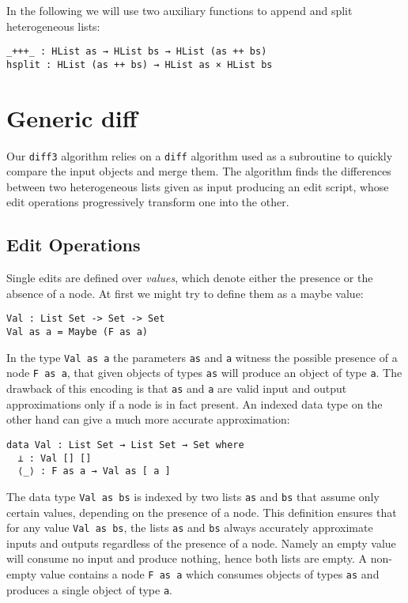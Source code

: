 \documentclass[preprint]{sigplanconf}
\begin{document}
	In the following we will use two auxiliary functions to append and split 
	heterogeneous lists:
\begin{verbatim}
_+++_ : HList as → HList bs → HList (as ++ bs)
hsplit : HList (as ++ bs) → HList as × HList bs
\end{verbatim}
	
\section{Generic diff}
	Our \texttt{diff3} algorithm relies on a \texttt{diff} algorithm used 
        as a subroutine to quickly compare the input objects and merge them.
	The algorithm finds the differences between two heterogeneous lists given 
	as input producing an edit script, whose edit operations progressively 
	transform one into the other.

	\subsection{Edit Operations}
	Single edits are defined over \emph{values}, which denote either the presence or 
	the absence of a node.
        At first we might try to define them as a maybe value:
\begin{verbatim}
Val : List Set -> Set -> Set
Val as a = Maybe (F as a)
\end{verbatim}
        In the type \texttt{Val as a} the parameters \texttt{as} and \texttt{a} 
        witness the possible presence of a node \texttt{F as a}, that given objects 
        of types \texttt{as} will produce an object of type \texttt{a}.
        The drawback of this encoding is that \texttt{as} and \texttt{a} are 
        valid input and output approximations only if a node is in fact present.
        An indexed data type on the other hand can give a much more accurate
        approximation:
\begin{verbatim}
data Val : List Set → List Set → Set where
  ⊥ : Val [] []
  ⟨_⟩ : F as a → Val as [ a ] 
\end{verbatim}
        The data type \texttt{Val as bs} is indexed by two lists \texttt{as} and 
        \texttt{bs} that assume only certain values, depending on the presence
        of a node. This definition ensures that for any value \texttt{Val as bs}, 
        the lists \texttt{as} and \texttt{bs} always accurately approximate inputs 
        and outputs regardless of the presence of a node.
	Namely an empty value will consume no input and produce nothing, hence
        both lists are empty.
        A non-empty value contains a node \texttt{F as a} which consumes 
        objects of types \texttt{as} and produces a single object of type \texttt{a}.
\end{document}
